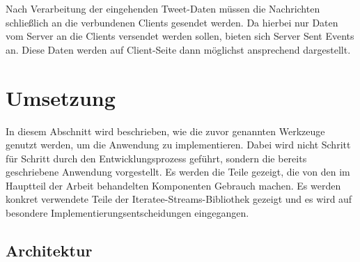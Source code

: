 Nach Verarbeitung der eingehenden Tweet-Daten müssen die Nachrichten schließlich an die verbundenen Clients gesendet werden.
Da hierbei nur Daten vom Server an die Clients versendet werden sollen, bieten sich Server Sent Events an.
Diese Daten werden auf Client-Seite dann möglichst ansprechend dargestellt.


\section{Umsetzung} %
\label{sec:umsetzung}

In diesem Abschnitt wird beschrieben, wie die zuvor genannten Werkzeuge genutzt werden, um die Anwendung zu implementieren.
Dabei wird nicht Schritt für Schritt durch den Entwicklungsprozess geführt, sondern die bereits geschriebene Anwendung vorgestellt.
Es werden die Teile gezeigt, die  von den im Hauptteil der Arbeit behandelten Komponenten Gebrauch machen.
Es werden konkret verwendete Teile der Iteratee-Streams-Bibliothek gezeigt und es wird auf besondere Implementierungsentscheidungen eingegangen.

\subsection{Architektur} %
\label{sub:architektur_twitter_news}

